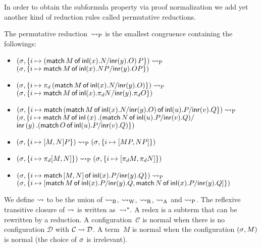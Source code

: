 {In order to obtain the subformula property
 via proof normalization
we add yet another kind of reduction rules called permutative
 reductions.
\begin{definition}
 The permutative reduction~$\preduce$ is the smallest congruence
 containing the followings:
\begin{itemize}
 \small
 \item $\conf{}{\imapsto{ \left(\mat  M x N y O\right) P }}\preduce$ \\
       $\conf{}{\imapsto{ \mat M x {N P} y {O P} }}$
 \item $\conf{}{\imapsto{ \pi_d \left(\mat M x N y
       O\right)}}\preduce$\\
       $\conf{}{\imapsto{ \mat M x
       {\pi_d N} y {\pi_d O} }}$
 \item {
       $\conf{}{\imapsto{ \mat
                          {\left(\mat  M x N y O\right)}
                          u P v Q
                     } }\preduce$ \\
       $(\lstore,
       \{i\mapsto
        \mathsf{match}\,{M}\,\mathsf{of}\, \linl{x}. {
                          {\left(\mat N u P v Q\right)}
       } /$ \\ \phantom{mmmmmmmmmmm}$
       \linr{y}. {\left(\mat  O u P v Q\right)}
                      \})
       $}
 \item $\conf{}{ \imapsto{\cotuple{M, N} P} }\preduce
        \conf{}{ \imapsto{\cotuple{MP, NP} }}$
 \item $\conf{}{ \imapsto{\pi_d\cotuple{M,N} }}\preduce
        \conf{}{ \imapsto{\cotuple{\pi_d M, \pi_d N}} }$
 \item $\conf{}{ \imapsto{\mat {\cotuple{M,N}} x P y Q }}\preduce$\\
       $\conf{}{ \imapsto{\cotuple{
                          \mat  M x P y Q,
                          \mat N x P y Q
                        }} }$
\end{itemize}
\end{definition}

We define $\reduce$ to be the union of $\breduce$, $\wreduce$, $\rreduce$,
$\areduce$ and $\preduce$.
The reflexive transitive closure of $\reduce$ is
written as~$\reduction$.
A redex is a subterm that can be rewritten by a reduction.
A configuration~$\mathcal{C}$ is normal when there is no configuration
$\mathcal{D}$ with $\mathcal{C}\reduce \mathcal{D}$.
A term~$M$ is normal when the configuration $\conf{}{M}$ is
normal (the choice of $\lstore$ is irrelevant).

}
